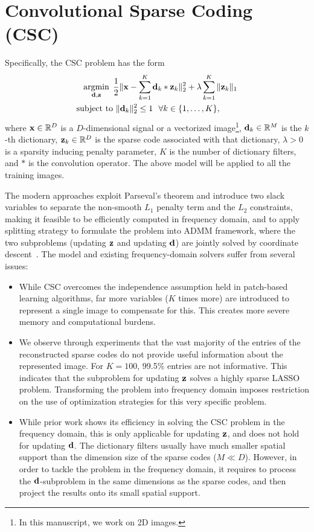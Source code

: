 \section{Convolutional Sparse Coding (CSC)}
Specifically, the CSC problem has the form
\begin{equation}\label{eq:CSCmodel}
\begin{split}
    \minimize{\filter,\code} & \frac{1}{2}\|\signal - \sum_{k=1}^{K} \filter_k * \code_k \|_2^2 + \lambda \sum_{k=1}^{K}\| \code_k \|_1 \\
    \text{subject to} & ~ \|\filter_k\|^2_2 \leq 1 ~~ \forall k \in \{1,\dots,K\},
\end{split}
\end{equation}
where $\signal \in \mathbb{R}^D$ is a $D$-dimensional signal or a vectorized image\footnote{In this manuscript, we work on 2D images.}, $\filter_k \in \mathbb{R}^M$ is the $k$-th dictionary, $\code_k\in \mathbb{R}^D$ is the sparse code associated with that dictionary,  $\lambda>0$ is a sparsity inducing penalty parameter, $K$ is the number of dictionary filters, and $*$ is the convolution operator. The above model will be applied to all the training images.

The modern approaches exploit Parseval's theorem and introduce two slack variables to separate the non-smooth $L_1$ penalty term and the $L_2$ constraints, making it feasible to be efficiently computed in frequency domain, and to apply splitting strategy to formulate the problem into ADMM framework, where the two subproblems (updating $\code$ and updating $\filter$) are jointly solved by coordinate descent~\cite{bristow2013fast,heide2015fast,wohlberg2016efficient}. The model and existing frequency-domain solvers suffer from several issues:

\begin{itemize}
  \item While CSC overcomes the independence assumption held in patch-based learning algorithms, far more variables ($K$ times more) are introduced to represent a single image to compensate for this. This creates more severe memory and computational burdens.

  \item We observe through experiments that the vast majority of the entries of the reconstructed sparse codes do not provide useful information about the represented image. For $K=100$, 99.5\% entries are not informative. This indicates that the subproblem for updating $\code$ solves a highly sparse LASSO problem. Transforming the problem into frequency domain imposes restriction on the use of optimization strategies for this very specific problem.

  \item While prior work shows its efficiency in solving the CSC problem in the frequency domain, this is only applicable for updating $\code$, and does not hold for updating $\filter$. The dictionary filters usually have much smaller spatial support than the dimension size of the sparse codes ($M \ll D$). However, in order to tackle the problem in the frequency domain, it requires to process the $\filter$-subproblem in the same dimensions as the sparse codes, and then project the results onto its small spatial support.
\end{itemize} 